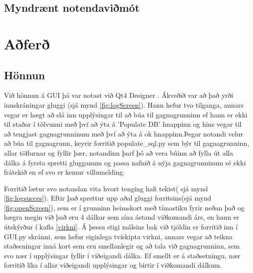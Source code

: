 \documentclass[12pt, git, final]{rureport}
\begin{document}
\subsection{Myndrænt notendaviðmót}



\section{Aðferð}
\subsection{Hönnun}
Við hönnun á GUI þá var notast við Qt4 Designer \cite{qt4}. Ákveðið var að það yrði innskráningar gluggi (sjá mynd \ref{fig:logScreen}). Hann hefur tvo tilganga, annars vegar er hægt að slá inn upplýsingar til að búa til gagnagrunninn ef hann er ekki til staðar í tölvunni með því að ýta á 'Populate DB' hnappinn og hins vegar til að tengjast gagnagrunninum með því að ýta á ok hnappinn.Þegar notandi velur að búa til gagnagrunn, keyrir forritið populate\_sql.py sem býr til gagnagrunninn, allar töflurnar og fyllir þær, notandinn þarf þó að vera búinn að fylla út alla dálka á fyrsta spretti glugganum og passa nafnið á nýja gagnagrunninum sé ekki frátekið en ef svo er kemur villumelding.

Forritið lætur svo notandan vita hvort tenging hafi tekist( sjá mynd \ref{fig:logsucces}). Eftir það sprettur upp aðal gluggi forritsins(sjá mynd \ref{fig:openScreen}), sem er í grunninn heimskort með tímastiku fyrir neðan það og hægra megin við það eru 4 dálkar sem sína ástand viðkomandi árs, en hann er útskýrður  í kafla \ref{virkni}. Á þessu stigi málsins bak við tjöldin er forritið inn í GUI.py skránni, sem hefur eiginlega tvískipta virkni, annars vegar að teikna staðseningar inná kort sem eru smellanlegir og að tala við gagnagrunninn, sem svo nær í upplýsingar fyllir í viðeigandi dálka. Ef smellt er á staðsetningu, nær forritið líka í allar viðeigandi upplýsingar og birtir í viðkomandi dálkum.
 

\end{document}
